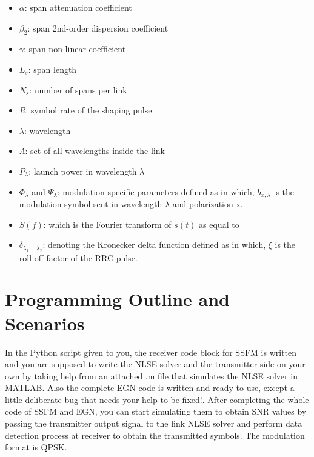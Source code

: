 \documentclass[10pt,letterpaper]{article}
\begin{document}
\begin{itemize}
\item
$\alpha$: span attenuation coefficient
\item
$\beta_2$: span 2nd-order dispersion coefficient
\item
$\gamma$: span non-linear coefficient
\item
$L_s$: span length
\item
$N_s$: number of spans per link
\item
$R$: symbol rate of the shaping pulse
\item
$\lambda$: wavelength
\item
$\Lambda$: set of all wavelengths inside the link
\item
$P_\lambda$: launch power in wavelength $\lambda$
\item
$\Phi_\lambda$ and $\Psi_\lambda$: modulation-specific parameters defined as
in which, $b_{x,\lambda}$ is the modulation symbol sent in wavelength $\lambda$ and polarization x.
\item
$S(f)$: which is the Fourier transform of $s(t)$ as equal to
\item
$\delta_{\lambda_1-\lambda_2}$: denoting the Kronecker delta function defined as
in which, $\xi$ is the roll-off factor of the RRC pulse.
\end{itemize}

\section{Programming Outline and Scenarios}
In the Python script given to you, the receiver code block for SSFM is written and you are supposed to write the NLSE solver and the transmitter side on your own by taking help from an attached .m file that simulates the NLSE solver in MATLAB. Also the complete EGN code is written and ready-to-use, except a little deliberate bug that needs your help to be fixed!. After completing the whole code of SSFM and EGN, you can start simulating them to obtain SNR values by passing the transmitter output signal to the link NLSE solver and perform data detection process at receiver to obtain the transmitted symbols. The modulation format is QPSK.
\end{document}
